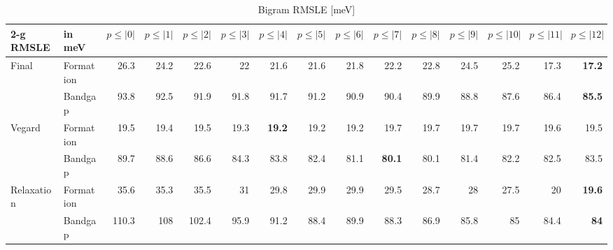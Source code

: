 \documentclass[11pt,oneside,czech,american]{book} %
\theoremstyle{definition} %
\theoremstyle{definition}
\begin{document}
\begin{table}[H]
	\scriptsize
	\centering
\begin{tabular}{llrrrrrrrrrrrrr}
	\hline
	2-g RMSLE   & in meV    &   $p{\leq}|0|$ &   $p{\leq}|1|$ &   $p{\leq}|2|$ &   $p{\leq}|3|$ &   $p{\leq}|4|$ &   $p{\leq}|5|$ &   $p{\leq}|6|$ &   $p{\leq}|7|$ &   $p{\leq}|8|$ &   $p{\leq}|9|$ &   $p{\leq}|10|$ &   $p{\leq}|11|$ &   $p{\leq}|12|$ \\
	\hline
	\multirow{2}{*}{Final}       & Formation &       26.3 &       24.2 &       22.6 &       22   &       21.6 &       21.6 &       21.8 &       22.2 &       22.8 &       24.5 &        25.2 &        17.3 &        \textbf{17.2} \\
	       & Bandgap   &       93.8 &       92.5 &       91.9 &       91.8 &       91.7 &       91.2 &       90.9 &       90.4 &       89.9 &       88.8 &        87.6 &        86.4 &        \textbf{85.5} \\
	\multirow{2}{*}{Vegard}      & Formation &       19.5 &       19.4 &       19.5 &       19.3 &       \textbf{19.2} &       19.2 &       19.2 &       19.7 &       19.7 &       19.7 &        19.7 &        19.6 &        19.5 \\
	      & Bandgap   &       89.7 &       88.6 &       86.6 &       84.3 &       83.8 &       82.4 &       81.1 &       \textbf{80.1} &       80.1 &       81.4 &        82.2 &        82.5 &        83.5 \\
	\multirow{2}{*}{Relaxation}  & Formation &       35.6 &       35.3 &       35.5 &       31   &       29.8 &       29.9 &       29.9 &       29.5 &       28.7 &       28   &        27.5 &        20   &        \textbf{19.6} \\
	  & Bandgap   &      110.3 &      108   &      102.4 &       95.9 &       91.2 &       88.4 &       89.9 &       88.3 &       86.9 &       85.8 &        85   &        84.4 &        \textbf{84}   \\
	\hline
\end{tabular}
	\caption{Bigram RMSLE [meV]}
	\label{2-g RMSLE hat}
\end{table}
\end{document}
